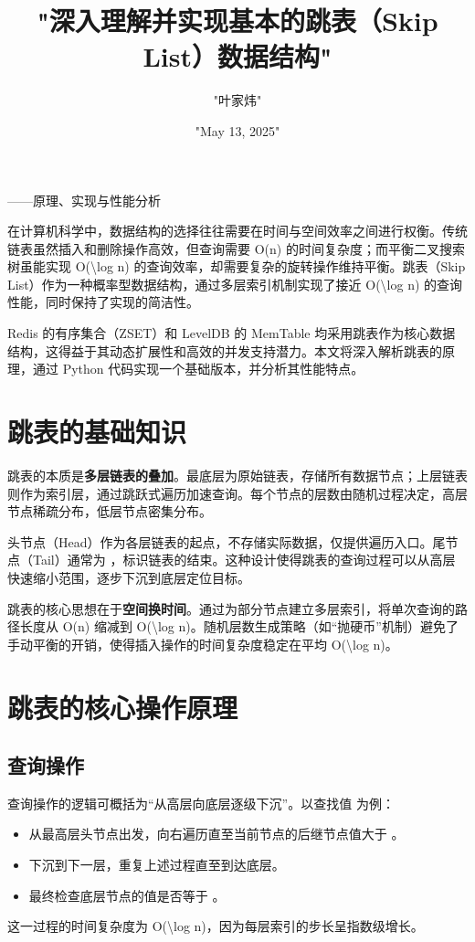 \title{"深入理解并实现基本的跳表（Skip List）数据结构"}
\author{"叶家炜"}
\date{"May 13, 2025"}
\maketitle
——原理、实现与性能分析\par
在计算机科学中，数据结构的选择往往需要在时间与空间效率之间进行权衡。传统链表虽然插入和删除操作高效，但查询需要 O(n) 的时间复杂度；而平衡二叉搜索树虽能实现 O(\textbackslash{}log n) 的查询效率，却需要复杂的旋转操作维持平衡。跳表（Skip List）作为一种概率型数据结构，通过多层索引机制实现了接近 O(\textbackslash{}log n) 的查询性能，同时保持了实现的简洁性。\par
Redis 的有序集合（ZSET）和 LevelDB 的 MemTable 均采用跳表作为核心数据结构，这得益于其动态扩展性和高效的并发支持潜力。本文将深入解析跳表的原理，通过 Python 代码实现一个基础版本，并分析其性能特点。\par
\chapter{跳表的基础知识}
跳表的本质是\textbf{多层链表的叠加}。最底层为原始链表，存储所有数据节点；上层链表则作为索引层，通过跳跃式遍历加速查询。每个节点的层数由随机过程决定，高层节点稀疏分布，低层节点密集分布。\par
头节点（Head）作为各层链表的起点，不存储实际数据，仅提供遍历入口。尾节点（Tail）通常为 ，标识链表的结束。这种设计使得跳表的查询过程可以从高层快速缩小范围，逐步下沉到底层定位目标。\par
跳表的核心思想在于\textbf{空间换时间}。通过为部分节点建立多层索引，将单次查询的路径长度从 O(n) 缩减到 O(\textbackslash{}log n)。随机层数生成策略（如“抛硬币”机制）避免了手动平衡的开销，使得插入操作的时间复杂度稳定在平均 O(\textbackslash{}log n)。\par
\chapter{跳表的核心操作原理}
\section{查询操作}
查询操作的逻辑可概括为“从高层向底层逐级下沉”。以查找值  为例：\par
\begin{itemize}
\item 从最高层头节点出发，向右遍历直至当前节点的后继节点值大于 。
\item 下沉到下一层，重复上述过程直至到达底层。
\item 最终检查底层节点的值是否等于 。
\end{itemize}
这一过程的时间复杂度为 O(\textbackslash{}log n)，因为每层索引的步长呈指数级增长。\par
